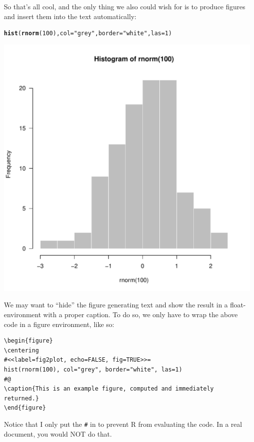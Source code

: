\documentclass[11pt, a4paper]{article}\usepackage[]{graphicx}\usepackage[]{color}
\makeatletter
\def\maxwidth{ %
  \ifdim\Gin@nat@width>\linewidth
    \linewidth
  \else
    \Gin@nat@width
  \fi
}
\newcommand{\hlnum}[1]{\textcolor[rgb]{0.686,0.059,0.569}{#1}}%
\newcommand{\hlstr}[1]{\textcolor[rgb]{0.192,0.494,0.8}{#1}}%
\newcommand{\hlstd}[1]{\textcolor[rgb]{0.345,0.345,0.345}{#1}}%
\newcommand{\hlkwc}[1]{\textcolor[rgb]{0.333,0.667,0.333}{#1}}%
\newcommand{\hlkwd}[1]{\textcolor[rgb]{0.737,0.353,0.396}{\textbf{#1}}}%
\newenvironment{kframe}{%
 \def\at@end@of@kframe{}%
 \ifinner\ifhmode%
  \def\at@end@of@kframe{\end{minipage}}%
  \begin{minipage}{\columnwidth}%
 \fi\fi%
 \def\FrameCommand##1{\hskip\@totalleftmargin \hskip-\fboxsep
 \colorbox{shadecolor}{##1}\hskip-\fboxsep
     \hskip-\linewidth \hskip-\@totalleftmargin \hskip\columnwidth}%
 \MakeFramed {\advance\hsize-\width
   \@totalleftmargin\z@ \linewidth\hsize
   \@setminipage}}%
 {\par\unskip\endMakeFramed%
 \at@end@of@kframe}
\newenvironment{knitrout}{}{} %
\makeatother
\begin{document}
\bigskip

\noindent So that's all cool, and the only thing we also could wish for is to produce figures and insert them into the text automatically:

\begin{knitrout}
\color{fgcolor}\begin{kframe}
\begin{alltt}
\hlkwd{hist}\hlstd{(}\hlkwd{rnorm}\hlstd{(}\hlnum{100}\hlstd{),} \hlkwc{col}\hlstd{=}\hlstr{"grey"}\hlstd{,} \hlkwc{border}\hlstd{=}\hlstr{"white"}\hlstd{,} \hlkwc{las}\hlstd{=}\hlnum{1}\hlstd{)}
\end{alltt}
\end{kframe}

{\centering \includegraphics[width=\maxwidth]{unnamed-chunk-6-1} 

}



\end{knitrout}

We may want to ``hide'' the figure generating text and show the result in a float-environment with a proper caption. To do so, we only have to wrap the above code in a figure environment, like so:
\begin{verbatim}
\begin{figure}
\centering
#<<label=fig2plot, echo=FALSE, fig=TRUE>>=
hist(rnorm(100), col="grey", border="white", las=1)
#@
\caption{This is an example figure, computed and immediately returned.}
\end{figure}
\end{verbatim}
Notice that I only put the \texttt{\#} in to prevent R from evaluating the code. In a real document, you would NOT do that.
\end{document}
